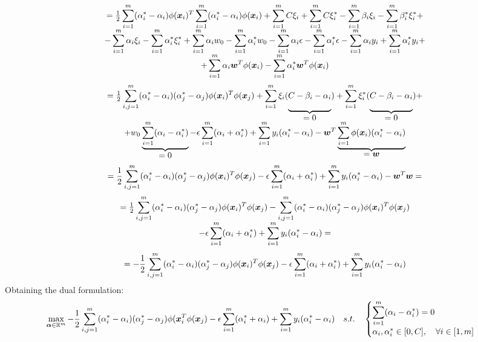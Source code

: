 \[
  \begin{array}{c}
    =\frac{1}{2}\displaystyle\sum_{i=1}^m(\alpha_i^*-\alpha_i)\phi(\bm{x}_i)^T\displaystyle\sum_{i=1}^m(\alpha_i^*-\alpha_i)\phi(\bm{x}_i)+\displaystyle\sum_{i=1}^mC\xi_i+\displaystyle\sum_{i=1}^mC\xi_i^*-\displaystyle\sum_{i=1}^m\beta_i\xi_i-\displaystyle\sum_{i=1}^m\beta_i^*\xi_i^*+\\
    -\displaystyle\sum_{i=1}^m\alpha_i\xi_i-\displaystyle\sum_{i=1}^m\alpha_i^*\xi_i^*+\displaystyle\sum_{i=1}^m\alpha_iw_0-\displaystyle\sum_{i=1}^m\alpha_i^*w_0-\displaystyle\sum_{i=1}^m\alpha_i\epsilon-\displaystyle\sum_{i=1}^m\alpha_i^*\epsilon -\displaystyle\sum_{i=1}^m\alpha_iy_i+\displaystyle\sum_{i=1}^m\alpha_i^*y_i+\\
    +\displaystyle\sum_{i=1}^m\alpha_i\bm{w}^T\phi(\bm{x}_i)-\displaystyle\sum_{i=1}^m\alpha_i^*\bm{w}^T\phi(\bm{x}_i)
  \end{array}
\]
\[
  \begin{array}{c}
    =\frac{1}{2}\Sum_{i,j=1}^m(\alpha_i^*-\alpha_i)(\alpha_j^*-\alpha_j)\phi(\vect{x}_i)^T\phi(\vect{x}_j)+\Sum_{i=1}^m\xi_i(
      \underbrace{C-\beta_i-\alpha_i \rule[-12pt]{0pt}{5pt}}_{\mbox{$=0$}})+\Sum_{i=1}^m\xi_i^*(
      \underbrace{C-\beta_i-\alpha_i \rule[-12pt]{0pt}{5pt}}_{\mbox{$=0$}})+\\
    +w_0
      \underbrace{\Sum_{i=1}^m(\alpha_i-\alpha_i^*) \rule[-12pt]{0pt}{5pt}}_{\mbox{$=0$}}-\epsilon\Sum_{i=1}^m(\alpha_i+\alpha_i^*)+\Sum_{i=1}^my_i(\alpha_i^*-\alpha_i)-\vect{w}^T
      \underbrace{\Sum_{i=1}^m\phi(\vect{x}_i)(\alpha_i^*-\alpha_i) \rule[-12pt]{0pt}{5pt}}_{\mbox{$=\vect{w}$}}
  \end{array}
\]
\[
  =\frac{1}{2}\displaystyle\sum_{i,j=1}^m(\alpha_i^*-\alpha_i)(\alpha_j^*-\alpha_j)\phi(\bm{x}_i)^T\phi(\bm{x}_j)-\epsilon\displaystyle\sum_{i=1}^m(\alpha_i+\alpha_i^*)+\displaystyle\sum_{i=1}^my_i(\alpha_i^*-\alpha_i)-\bm{w}^T\bm{w}=
\]
\[
  \begin{array}{c}
    =\frac{1}{2}\displaystyle\sum_{i,j=1}^m(\alpha_i^*-\alpha_i)(\alpha_j^*-\alpha_j)\phi(\bm{x}_i)^T\phi(\bm{x}_j)-\displaystyle\sum_{i,j=1}^m(\alpha_i^*-\alpha_i)(\alpha_j^*-\alpha_j)\phi(\bm{x}_i)^T\phi(\bm{x}_j)\\
    -\epsilon\displaystyle\sum_{i=1}^m(\alpha_i+\alpha_i^*)+\displaystyle\sum_{i=1}^my_i(\alpha_i^*-\alpha_i)=
  \end{array}
\]
\[
  =-\frac{1}{2}\displaystyle\sum_{i,j=1}^m(\alpha_i^*-\alpha_i)(\alpha_j^*-\alpha_j)\phi(\bm{x}_i)^T\phi(\bm{x}_j)-\epsilon\displaystyle\sum_{i=1}^m(\alpha_i+\alpha_i^*)+\displaystyle\sum_{i=1}^my_i(\alpha_i^*-\alpha_i)
\]
Obtaining the dual formulation:
\[\max\limits_{\bm{\alpha}\in\mathbb{R}^m}-\frac{1}{2}\displaystyle\sum_{i,j=1}^m(\alpha_i^*-\alpha_i)(\alpha_j^*-\alpha_j)\phi(\bm{x}_i^T\phi(\bm{x}_j)-\epsilon\displaystyle\sum_{i=1}^m(\alpha_i^*+\alpha_i)+\displaystyle\sum_{i=1}^my_i(\alpha_i^*-\alpha_i)\quad s.t.\quad 
  \begin{cases}
    \displaystyle\sum_{i=1}^m(\alpha_i-\alpha_i^*)=0\\
    \alpha_i,\alpha_i^*\in[0,C], \quad \forall i \in[1,m]
  \end{cases}
\]
